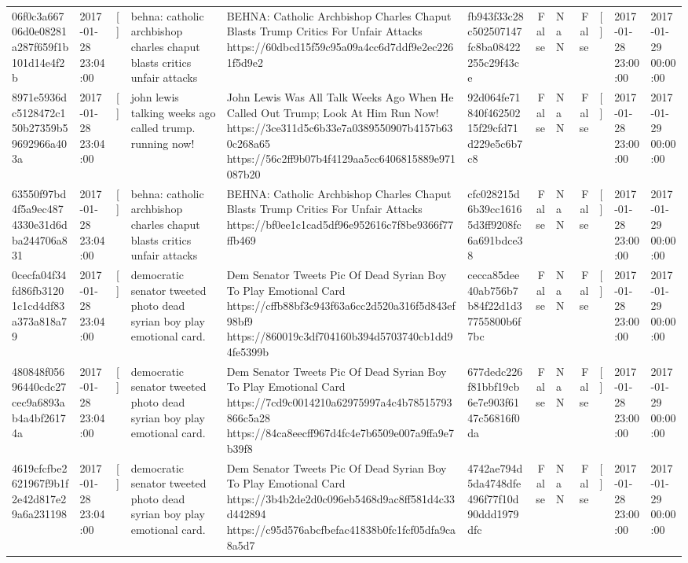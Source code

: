 \begin{tabular}{llllllrlrlll}
06f0c3a66706d0e08281a287f659f1b101d14e4f2b & 2017-01-28 23:04:00 & [] & behna: catholic archbishop charles chaput blasts critics unfair attacks & BEHNA: Catholic Archbishop Charles Chaput Blasts Trump Critics For Unfair Attacks https://60dbcd15f59c95a09a4cc6d7ddf9e2ec2261f5d9e2 & fb943f33c28c502507147fc8ba08422255c29f43ce & False & NaN & False & [] & 2017-01-28 23:00:00 & 2017-01-29 00:00:00 \\
8971e5936dc5128472c150b27359b59692966a403a & 2017-01-28 23:04:00 & [] & john lewis talking weeks ago called trump. running now! & John Lewis Was All Talk Weeks Ago When He Called Out Trump; Look At Him Run Now! https://3ce311d5c6b33e7a0389550907b4157b630c268a65 https://56c2ff9b07b4f4129aa5cc6406815889e971087b20 & 92d064fe71840f46250215f29cfd71d229e5c6b7c8 & False & NaN & False & [] & 2017-01-28 23:00:00 & 2017-01-29 00:00:00 \\
63550f97bd4f5a9ec4874330e31d6dba244706a831 & 2017-01-28 23:04:00 & [] & behna: catholic archbishop charles chaput blasts critics unfair attacks & BEHNA: Catholic Archbishop Charles Chaput Blasts Trump Critics For Unfair Attacks https://bf0ee1c1cad5df96e952616c7f8be9366f77ffb469 & cfc028215d6b39cc16165d3ff9208fc6a691bdce38 & False & NaN & False & [] & 2017-01-28 23:00:00 & 2017-01-29 00:00:00 \\
0cecfa04f34fd86fb31201c1cd4df83a373a818a79 & 2017-01-28 23:04:00 & [] & democratic senator tweeted photo dead syrian boy play emotional card. & Dem Senator Tweets Pic Of Dead Syrian Boy To Play Emotional Card https://cffb88bf3c943f63a6cc2d520a316f5d843ef98bf9 https://860019c3df704160b394d5703740cb1dd94fe5399b & cecca85dee40ab756b7b84f22d1d37755800b6f7bc & False & NaN & False & [] & 2017-01-28 23:00:00 & 2017-01-29 00:00:00 \\
480848f05696440cdc27cec9a6893ab4a4bf26174a & 2017-01-28 23:04:00 & [] & democratic senator tweeted photo dead syrian boy play emotional card. & Dem Senator Tweets Pic Of Dead Syrian Boy To Play Emotional Card https://7cd9c0014210a62975997a4c4b78515793866c5a28 https://84ca8eecff967d4fc4e7b6509e007a9ffa9e7b39f8 & 677dedc226f81bbf19cb6e7e903f6147c56816f0da & False & NaN & False & [] & 2017-01-28 23:00:00 & 2017-01-29 00:00:00 \\
4619cfcfbe2621967f9b1f2e42d817e29a6a231198 & 2017-01-28 23:04:00 & [] & democratic senator tweeted photo dead syrian boy play emotional card. & Dem Senator Tweets Pic Of Dead Syrian Boy To Play Emotional Card https://3b4b2de2d0c096eb5468d9ac8ff581d4c33d442894 https://c95d576abcfbefac41838b0fc1fcf05dfa9ca8a5d7 & 4742ae794d5da4748dfe496f77f10d90ddd1979dfc & False & NaN & False & [] & 2017-01-28 23:00:00 & 2017-01-29 00:00:00 \\

\end{tabular}
